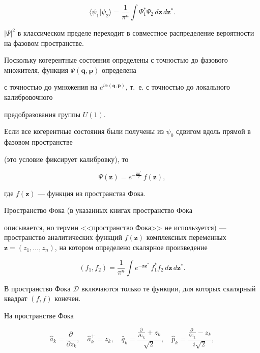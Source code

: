 $$

  \langle\psi_1|\psi_2\rangle=\frac1{\pi^n}\int \Psi_1^*\Psi_2\,d\mathbf{z}\,d\mathbf{z}^*.

$$

 $|\Psi|^2$ в классическом пределе переходит в совместное распределение вероятности на фазовом пространстве.



 Поскольку когерентные состояния определены с точностью до фазового множителя, функция $\Psi(\mathbf{q},\mathbf{p})$ определена

 с точностью до умножения на $e^{i\alpha(\mathbf{q},\mathbf{p})}$, т.~е. с точностью до локального калибровочного

 предобразования группы $U(1)$.



 Если все когерентные состояния были получены из $\psi_0$ сдвигом вдоль прямой в фазовом пространстве

 (это условие фиксирует калибровку), то

\begin{equation}\label{fok-gauge}

  \Psi(\mathbf{z})=e^{-\frac{\mathbf{zz}^*}2}\,f(\mathbf{z}),

\end{equation}

 где $f(\mathbf{z})$ --- функция из пространства Фока.



  Пространство Фока \cite{ivanovmg:bib:Faddeev,ivanovmg:bib:ivanovmg} (в указанных книгах пространство Фока

 описывается, но термин <<пространство Фока>> не используется) --- пространство аналитических функций $f(\mathbf{z})$ комплексных переменных $\mathbf{z}=(z_1,\dots,z_n)$, на котором определено скалярное произведение

\begin{equation}\label{f1f2}

 (f_1,f_2)=\frac1{\pi^n}\int e^{-\mathbf{zz}^*}\, f_1^*f_2\,d\mathbf{z}\,d\mathbf{z}^*.

\end{equation}

 В пространство Фока $\mathcal{D}$ включаются только те функции, для которых скалярный квадрат $(f,f)$ конечен.



 На пространстве Фока

\begin{equation}\label{aaqp}

\hat a_k=\frac{\partial~}{\partial z_k},\quad \hat a_k^+=z_k,\quad

  \hat q_k=\frac{\frac{\partial~}{\partial z_k}+z_k}{\sqrt2},\quad

  \hat p_k=\frac{\frac{\partial~}{\partial z_k}-z_k}{i\sqrt2},

\end{equation}

